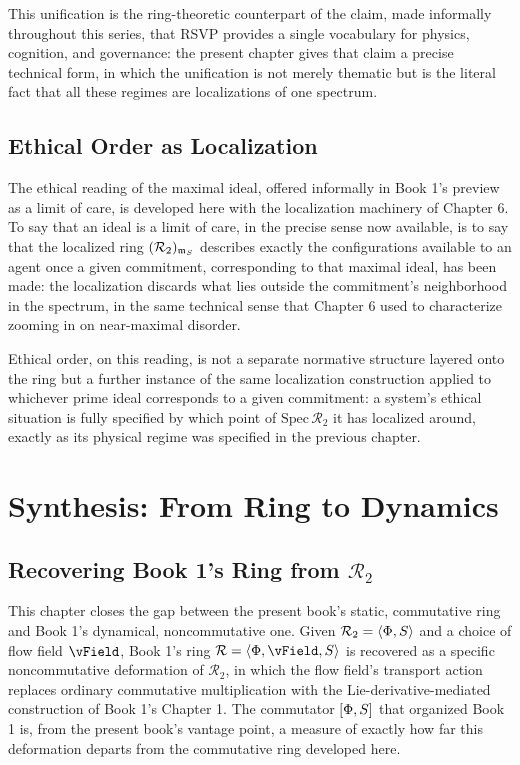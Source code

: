 This unification is the ring-theoretic counterpart of the claim, made informally throughout this series, that RSVP provides a single vocabulary for physics, cognition, and governance: the present chapter gives that claim a precise technical form, in which the unification is not merely thematic but is the literal fact that all these regimes are localizations of one spectrum.

\chapter{Ethical Order as Localization}

The ethical reading of the maximal ideal, offered informally in Book 1's preview as a limit of care, is developed here with the localization machinery of Chapter 6. To say that an ideal is a limit of care, in the precise sense now available, is to say that the localized ring $(\mathcal{R}_2)_{\mathfrak{m}_{S}}$ describes exactly the configurations available to an agent once a given commitment, corresponding to that maximal ideal, has been made: the localization discards what lies outside the commitment's neighborhood in the spectrum, in the same technical sense that Chapter 6 used to characterize zooming in on near-maximal disorder.

Ethical order, on this reading, is not a separate normative structure layered onto the ring but a further instance of the same localization construction applied to whichever prime ideal corresponds to a given commitment: a system's ethical situation is fully specified by which point of $\mathrm{Spec}\,\mathcal{R}_2$ it has localized around, exactly as its physical regime was specified in the previous chapter.

\part{Synthesis: From Ring to Dynamics}

\chapter{Recovering Book 1's Ring from $\mathcal{R}_2$}

This chapter closes the gap between the present book's static, commutative ring and Book 1's dynamical, noncommutative one. Given $\mathcal{R}_2 = \langle \Phi, S \rangle$ and a choice of flow field $\vField$, Book 1's ring $\mathcal{R} = \langle \PhiField, \vField, \SEntropy \rangle$ is recovered as a specific noncommutative deformation of $\mathcal{R}_2$, in which the flow field's transport action replaces ordinary commutative multiplication with the Lie-derivative-mediated construction of Book 1's Chapter 1. The commutator $[\Phi, S]$ that organized Book 1 is, from the present book's vantage point, a measure of exactly how far this deformation departs from the commutative ring developed here.

